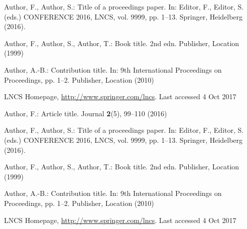 \documentclass[runningheads]{llncs}
\begin{document}
\begin{thebibliography}{8}
Author, F., Author, S.: Title of a proceedings paper. In: Editor,
F., Editor, S. (eds.) CONFERENCE 2016, LNCS, vol. 9999, pp. 1--13.
Springer, Heidelberg (2016). 

Author, F., Author, S., Author, T.: Book title. 2nd edn. Publisher,
Location (1999)

Author, A.-B.: Contribution title. In: 9th International Proceedings
on Proceedings, pp. 1--2. Publisher, Location (2010)

LNCS Homepage, \url{http://www.springer.com/lncs}. Last accessed 4
Oct 2017

Author, F.: Article title. Journal \textbf{2}(5), 99--110 (2016)

Author, F., Author, S.: Title of a proceedings paper. In: Editor,
F., Editor, S. (eds.) CONFERENCE 2016, LNCS, vol. 9999, pp. 1--13.
Springer, Heidelberg (2016). 

Author, F., Author, S., Author, T.: Book title. 2nd edn. Publisher,
Location (1999)

Author, A.-B.: Contribution title. In: 9th International Proceedings
on Proceedings, pp. 1--2. Publisher, Location (2010)

LNCS Homepage, \url{http://www.springer.com/lncs}. Last accessed 4
Oct 2017
\end{thebibliography}
\end{document}
